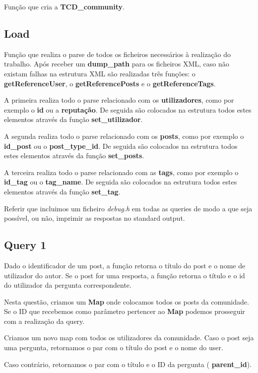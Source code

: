 \documentclass[a4paper]{article}
\begin{document}
Função que cria a \textbf{TCD\_community}. 

\subsection{Load}

Função que realiza o parse de todos os ficheiros necessários à realização
do trabalho. Após receber um \textbf{dump\_path} para os ficheiros XML,
caso não existam falhas na estrutura XML são realizadas três funções:
o \textbf{getReferenceUser}, o \textbf{getReferencePosts} e o
\textbf{getReferenceTags}.

A primeira realiza todo o parse relacionado com os \textbf{utilizadores}, 
como por exemplo o \textbf{id} ou a \textbf{reputação}. De seguida são 
colocados na estrutura todos estes elementos através da função
\textbf{set\_utilizador}.

A segunda realiza todo o parse relacionado com os \textbf{posts}, 
como por exemplo o \textbf{id\_post} ou o \textbf{post\_type\_id}. 
De seguida são colocados na estrutura todos estes elementos através da 
função \textbf{set\_posts}.

A terceira realiza todo o parse relacionado com as \textbf{tags}, 
como por exemplo o \textbf{id\_tag} ou o \textbf{tag\_name}. 
De seguida são colocados na estrutura todos estes elementos através da 
função \textbf{set\_tag}.

Referir que incluimos um ficheiro \textit{debug.h} em todas as queries 
de modo a que seja possível, ou não, imprimir as respostas no 
standard output.

\subsection{Query 1}

Dado o identificador de um post, a função retorna o título do post 
e o nome de utilizador do autor. Se o post for uma resposta, a função
retorna o título e o id do utilizador da pergunta correspondente.

Nesta questão, criamos um  \textbf{Map} onde colocamos todos os posts da comunidade.
Se o ID que recebemos como parâmetro pertencer ao  \textbf{Map} podemos prosseguir com a realização da query.

Criamos um novo map com todos os utilizadores da comunidade. Caso o post seja uma pergunta, retornamos o par com o título do post e o nome do user.

Caso contrário, retornamos o par com o título e o ID da pergunta ( \textbf{parent_id}).
\end{document}
